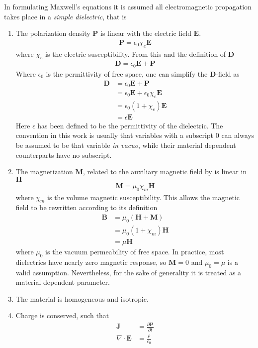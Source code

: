 In formulating Maxwell's equations it is assumed all electromagnetic
propagation takes place in a {\it simple dielectric}, that is
\begin{enumerate}
\item The polarization density $\mathbf{P}$ is linear with the electric
field $\mathbf{E}$.  
\begin{align}
\mathbf{P}=\epsilon_0\chi_e\mathbf{E}
\end{align}
where $\chi_e$ is the electric susceptibility.  From this and the definition
of $\mathbf{D}$
\begin{align}
\mathbf{D}=\epsilon_0\mathbf{E}+\mathbf{P}
\label{eqn:dfield}
\end{align}
Where $\epsilon_0$ is the permittivity of free space, one can simplify the
$\mathbf{D}$-field as 
\begin{align}
\mathbf{D}&=\epsilon_0\mathbf{E}+\mathbf{P}\\
&=\epsilon_0 \mathbf{E}+\epsilon_0 \chi_e \mathbf{E}\\
&=\epsilon_0(1+\chi_e)\mathbf{E}\\
&=\epsilon\mathbf{E}
\end{align}
Here $\epsilon$ has been defined to be the permittivity of the
dielectric.  The convention in this work is usually that variables with a
subscript $0$ can always be assumed to be that variable {\it in vacuo},
while their material dependent counterparts have no subscript.
\item The magnetization $\mathbf{M}$, related to the auxiliary magnetic
field by is linear in $\mathbf{H}$
\begin{align}
\mathbf{M}=\mu_0\chi_m\mathbf{H}
\end{align}
where $\chi_m$ is the volume magnetic susceptibility.  This allows the
magnetic field to be rewritten according to its definition
\begin{align}
\mathbf{B}&=\mu_0\left(\mathbf{H}+\mathbf{M}\right)\\
&=\mu_0\left(1+\chi_m\right)\mathbf{H}\\
&=\mu \mathbf{H}
\end{align}
where $\mu_0$ is the vacuum permeability of free space.  In practice, most
dielectrics have nearly zero magnetic response, so $\mathbf{M}=0$ and
$\mu_0=\mu$ is a valid assumption.  Nevertheless, for the sake of generality it is treated as a
material dependent parameter.
\item The material is homogeneous and isotropic.
\item Charge is conserved, such that
\begin{align}
\mathbf{J} &= \frac{\partial\mathbf{P}}{\partial t}\\
\nabla \cdot \mathbf{E} &= \frac{\rho}{\epsilon_0}
\end{align}
\end{enumerate}
